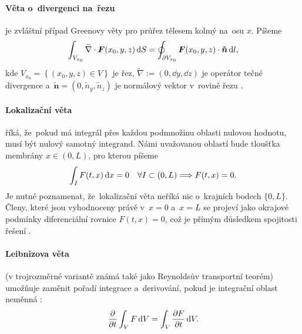 \paragraph{Věta o~divergenci na~řezu} je zvláštní případ Greenovy věty pro průřez tělesem kolmý na~osu $x$. Píšeme
\begin{equation}\label{eq:green_slice}
    \int_{V_{x_0}} \widetilde{\nabla} \cdot \bm{F}(x_0, y, z) \,\mathrm{d}{S} =
    \oint_{\partial V_{x_0}} \bm{F}(x_0,y,z) \cdot \bm{\tilde{n}}\,\mathrm{d}{l},
\end{equation}
kde $V_{x_0}=\left\{\left(x_0, y, z\right)\in V\right\}$ je řez, $\widetilde{\nabla}:=\left(0, \dd{}{y}, \dd{}{z}\right)$ je operátor tečné divergence a~$\bm{\tilde{n}}=\left(0, \tilde{n}_y, \tilde{n}_z\right)$ je normálový vektor v~rovině řezu \cite{whitaker2013}.

\paragraph{Lokalizační věta} říká, že~pokud má integrál přes každou podmnožinu oblasti nulovou hodnotu, musí být nulový samotný integrand. Námi uvažovanou oblastí bude tloušťka membrány $x\in(0,L)$, pro kterou píšeme
\begin{equation}
    \int_I F(t, x) \,\mathrm{d}{x} = 0 \quad\forall I\subset \left(0,L\right) \Longrightarrow F(t, x) = 0.
\end{equation}
Je nutné poznamenat, že~lokalizační věta neříká nic o~krajních bodech $\{0,L\}$. Členy, které jsou vyhodnoceny právě v~$x=0$ a~$x=L$ se projeví jako okrajové podmínky diferenciální rovnice $F(t,x)=0$, což je přímým důsledkem spojitosti řešení \cite{evans2022}.

\paragraph{Leibnizova věta} (v trojrozměrné variantě známá také jako Reynoldsův transportní teorém) umožňuje zaměnit pořadí integrace a~derivování, pokud je integrační oblast neměnná \cite{aris2012}:
\begin{equation}
    \frac{\partial }{\partial t}\int_{V}F \,\mathrm{d}{V}=\int_{V}\frac{\partial F}{\partial t}\,\mathrm{d}{V}.
\end{equation}

